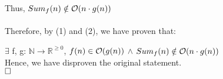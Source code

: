 \documentclass[12pt]{article}
\begin{document}
Thus, $Sum_{f}(n) \notin \mathcal O (n\cdot g(n))$ \\
~\\
Therefore, by (1) and (2), we have proven that:

$\exists$ f, g: $\mathbb{N} \rightarrow \mathbb{R}^{\geq 0}$, $f(n) \in \mathcal O (g(n))$ $\wedge$ $Sum_{f}(n) \notin \mathcal O (n\cdot g(n))$ \\
Hence, we have disproven the original statement. \\

$\hfill\square$ 

\vspace{20pt}
\end{document}
